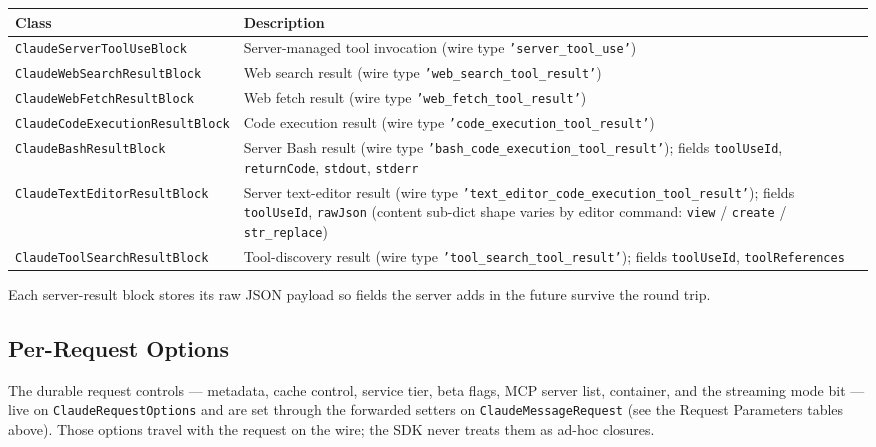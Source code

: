 \documentclass[a4paper,10pt,fleqn]{article}
\newcommand{\cls}[1]{\texttt{#1}}
\begin{document}
\begin{center}
\small
\begin{tabular}{@{}lp{9cm}@{}}
\toprule
\textbf{Class} & \textbf{Description} \\
\midrule
\cls{ClaudeServerToolUseBlock}        & Server-managed tool invocation (wire type \texttt{'server\_tool\_use'}) \\
\cls{ClaudeWebSearchResultBlock}      & Web search result (wire type \texttt{'web\_search\_tool\_result'}) \\
\cls{ClaudeWebFetchResultBlock}       & Web fetch result (wire type \texttt{'web\_fetch\_tool\_result'}) \\
\cls{ClaudeCodeExecutionResultBlock}  & Code execution result (wire type \texttt{'code\_execution\_tool\_result'}) \\
\cls{ClaudeBashResultBlock}           & Server Bash result (wire type \texttt{'bash\_code\_execution\_tool\_result'}); fields \texttt{toolUseId}, \texttt{returnCode}, \texttt{stdout}, \texttt{stderr} \\
\cls{ClaudeTextEditorResultBlock}     & Server text-editor result (wire type \texttt{'text\_editor\_code\_execution\_tool\_result'}); fields \texttt{toolUseId}, \texttt{rawJson} (content sub-dict shape varies by editor command: \texttt{view} / \texttt{create} / \texttt{str\_replace}) \\
\cls{ClaudeToolSearchResultBlock}     & Tool-discovery result (wire type \texttt{'tool\_search\_tool\_result'}); fields \texttt{toolUseId}, \texttt{toolReferences} \\
\bottomrule
\end{tabular}
\end{center}

Each server-result block stores its raw JSON payload so fields
the server adds in the future survive the round trip.

\subsection{Per-Request Options}

The durable request controls --- metadata, cache control,
service tier, beta flags, MCP server list, container, and the
streaming mode bit --- live on \cls{ClaudeRequestOptions} and
are set through the forwarded setters on
\cls{ClaudeMessageRequest} (see the Request Parameters tables
above).  Those options travel with the request on the wire; the
SDK never treats them as ad-hoc closures.
\end{document}
